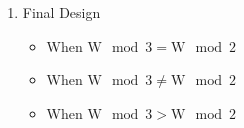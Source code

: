 \documentclass{article}
\newlength{\ansindent}
\begin{document}
\begin{enumerate}[label=\arabic*)]
\begin{enumerate}[label=Step \arabic* :,itemindent=\ansindent]
\begin{table}[H]
\begin{tabular}{cc}
\begin{tabular}{lll}
							$\delta(q_3,a)$ & $=$ & $q_4$ \\
							$\delta(q_4,a)$ & $=$ & $q_5$ \\
							$\delta(q_5,a)$ & $=$ & $q_0$
						\end{tabular}
					\end{tabular}
				\end{table}
				\item Final Design
					\begin{itemize}[leftmargin=2.5em]
						\item When $\text{W} \mod 3=\text{W} \mod 2$ 
						\item When $\text{W} \mod 3\ne\text{W} \mod 2$ 
						\item When $\text{W} \mod 3>\text{W} \mod 2$ 
					\end{itemize}
			\end{enumerate} \newpage


\end{enumerate}
\end{document}
